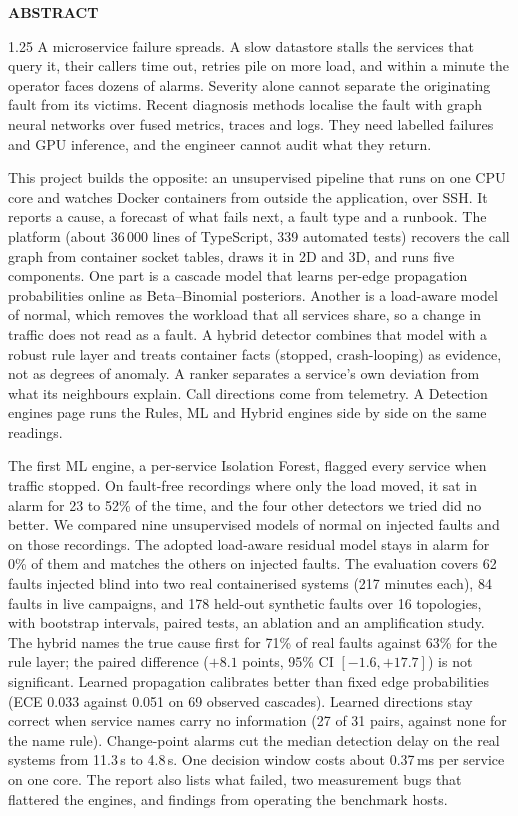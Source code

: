\thispagestyle{empty}
\begin{center}{\bfseries\Large ABSTRACT\par}\end{center}
\vspace{4pt}
\begin{spacing}{1.25}\small
A microservice failure spreads. A slow datastore stalls the services that query it, their callers time out, retries pile on more load, and within a minute the operator faces dozens of alarms. Severity alone cannot separate the originating fault from its victims. Recent diagnosis methods localise the fault with graph neural networks over fused metrics, traces and logs. They need labelled failures and GPU inference, and the engineer cannot audit what they return.

This project builds the opposite: an unsupervised pipeline that runs on one CPU core and watches Docker containers from outside the application, over SSH. It reports a cause, a forecast of what fails next, a fault type and a runbook. The platform (about 36\,000 lines of TypeScript, 339 automated tests) recovers the call graph from container socket tables, draws it in 2D and 3D, and runs five components. One part is a cascade model that learns per-edge propagation probabilities online as Beta--Binomial posteriors. Another is a load-aware model of normal, which removes the workload that all services share, so a change in traffic does not read as a fault. A hybrid detector combines that model with a robust rule layer and treats container facts (stopped, crash-looping) as evidence, not as degrees of anomaly. A ranker separates a service's own deviation from what its neighbours explain. Call directions come from telemetry. A Detection engines page runs the Rules, ML and Hybrid engines side by side on the same readings.

The first ML engine, a per-service Isolation Forest, flagged every service when traffic stopped. On fault-free recordings where only the load moved, it sat in alarm for 23 to 52\% of the time, and the four other detectors we tried did no better. We compared nine unsupervised models of normal on injected faults and on those recordings. The adopted load-aware residual model stays in alarm for 0\% of them and matches the others on injected faults. The evaluation covers 62 faults injected blind into two real containerised systems (217 minutes each), 84 faults in live campaigns, and 178 held-out synthetic faults over 16 topologies, with bootstrap intervals, paired tests, an ablation and an amplification study. The hybrid names the true cause first for 71\% of real faults against 63\% for the rule layer; the paired difference ($+8.1$ points, 95\% CI $[-1.6,+17.7]$) is not significant. Learned propagation calibrates better than fixed edge probabilities (ECE 0.033 against 0.051 on 69 observed cascades). Learned directions stay correct when service names carry no information (27 of 31 pairs, against none for the name rule). Change-point alarms cut the median detection delay on the real systems from 11.3\,s to 4.8\,s. One decision window costs about 0.37\,ms per service on one core. The report also lists what failed, two measurement bugs that flattered the engines, and findings from operating the benchmark hosts.
\end{spacing}
\clearpage

